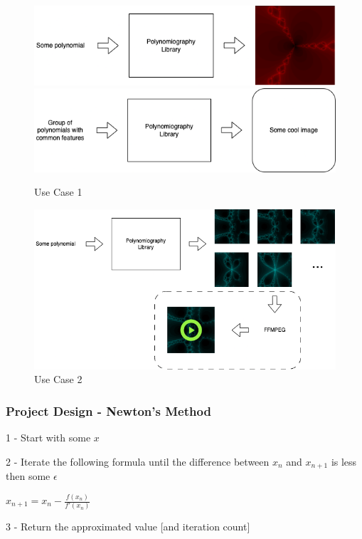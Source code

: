 \documentclass{beamer}
\begin{document}
\begin{projectdesign}
	\begin{figure}[h]
		\centering
		\includegraphics[width=1\textwidth]{fig2}
		\includegraphics[width=1\textwidth]{fig6}
		\caption{Use Case 1}
	\end{figure}
\end{projectdesign}


\begin{projectdesign}
	\begin{figure}[h]
		\centering
		\includegraphics[width=1\textwidth]{fig3}
		\caption{Use Case 2}
	\end{figure}
\end{projectdesign}

\begin{contents}
        \frametitle{{\color{white} Project Design - Newton's Method}}
        \begin{itemize}
            \item 1 - Start with some $x$
            \item 2 - Iterate the following formula until the difference between $x_n$ and $x_{n+1}$ is less then some $\epsilon$
            \begin{center}
            \item \( x_{n+1} = x_n - \frac{f(x_n)}{f'(x_n)} \)
            \end{center}
            \item
            \item 3 - Return the approximated value [and iteration count]
        \end{itemize}
\end{contents}
\end{document}
